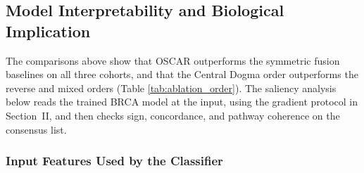 \documentclass[lettersize,journal]{IEEEtran}
\begin{document}




\subsection{Model Interpretability and Biological Implication}

The comparisons above show that OSCAR outperforms the symmetric fusion baselines on all three cohorts, and that the Central Dogma order outperforms the reverse and mixed orders (Table \ref{tab:ablation_order}). The saliency analysis below reads the trained BRCA model at the input, using the gradient protocol in Section~II, and then checks sign, concordance, and pathway coherence on the consensus list.

\subsubsection{Input Features Used by the Classifier}
\end{document}
